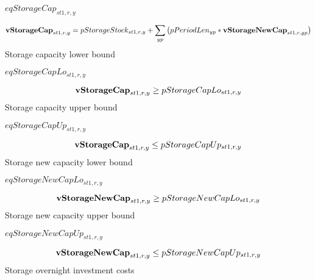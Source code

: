 \documentclass{article}
\begin{document}
$eqStorageCap_{st1,r,y}$





\begin{dmath}
{\bf vStorageCap}_{st1,r,y}  =  pStorageStock_{st1,r,y}+\sum_{yp}{\left(pPeriodLen_{yp}*{\bf vStorageNewCap}_{st1,r,yp}\right)}
\end{dmath}
Storage capacity lower bound







$eqStorageCapLo_{st1,r,y}$





\begin{dmath}
{\bf vStorageCap}_{st1,r,y}  \ge  pStorageCapLo_{st1,r,y}
\end{dmath}
Storage capacity upper bound







$eqStorageCapUp_{st1,r,y}$





\begin{dmath}
{\bf vStorageCap}_{st1,r,y}  \le  pStorageCapUp_{st1,r,y}
\end{dmath}
Storage new capacity lower bound







$eqStorageNewCapLo_{st1,r,y}$





\begin{dmath}
{\bf vStorageNewCap}_{st1,r,y}  \ge  pStorageNewCapLo_{st1,r,y}
\end{dmath}
Storage new capacity upper bound







$eqStorageNewCapUp_{st1,r,y}$





\begin{dmath}
{\bf vStorageNewCap}_{st1,r,y}  \le  pStorageNewCapUp_{st1,r,y}
\end{dmath}
Storage overnight investment costs
\end{document}
